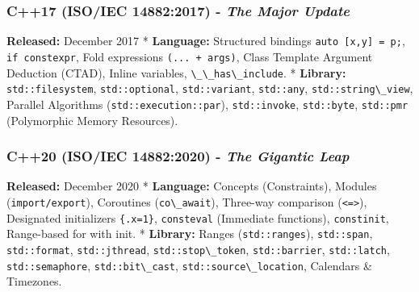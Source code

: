 \hypertarget{c17-isoiec-148822017---the-major-update}{%
\subsubsection{\texorpdfstring{\textbf{C++17 (ISO/IEC 14882:2017)} -
\emph{The Major
Update}}{C++17 (ISO/IEC 14882:2017) - The Major Update}}\label{c17-isoiec-148822017---the-major-update}}

\textbf{Released:} December 2017 * \textbf{Language:} Structured
bindings \passthrough{\lstinline!auto [x,y] = p;!},
\passthrough{\lstinline!if constexpr!}, Fold expressions
\passthrough{\lstinline!(... + args)!}, Class Template Argument
Deduction (CTAD), Inline variables,
\passthrough{\lstinline!\_\_has\_include!}. * \textbf{Library:}
\passthrough{\lstinline!std::filesystem!},
\passthrough{\lstinline!std::optional!},
\passthrough{\lstinline!std::variant!},
\passthrough{\lstinline!std::any!},
\passthrough{\lstinline!std::string\_view!}, Parallel Algorithms
(\passthrough{\lstinline!std::execution::par!}),
\passthrough{\lstinline!std::invoke!},
\passthrough{\lstinline!std::byte!}, \passthrough{\lstinline!std::pmr!}
(Polymorphic Memory Resources).

\hypertarget{c20-isoiec-148822020---the-gigantic-leap}{%
\subsubsection{\texorpdfstring{\textbf{C++20 (ISO/IEC 14882:2020)} -
\emph{The Gigantic
Leap}}{C++20 (ISO/IEC 14882:2020) - The Gigantic Leap}}\label{c20-isoiec-148822020---the-gigantic-leap}}

\textbf{Released:} December 2020 * \textbf{Language:} Concepts
(Constraints), Modules (\passthrough{\lstinline!import/export!}),
Coroutines (\passthrough{\lstinline!co\_await!}), Three-way comparison
(\passthrough{\lstinline!<=>!}), Designated initializers
\passthrough{\lstinline!\{.x=1\}!}, \passthrough{\lstinline!consteval!}
(Immediate functions), \passthrough{\lstinline!constinit!}, Range-based
for with init. * \textbf{Library:} Ranges
(\passthrough{\lstinline!std::ranges!}),
\passthrough{\lstinline!std::span!},
\passthrough{\lstinline!std::format!},
\passthrough{\lstinline!std::jthread!},
\passthrough{\lstinline!std::stop\_token!},
\passthrough{\lstinline!std::barrier!},
\passthrough{\lstinline!std::latch!},
\passthrough{\lstinline!std::semaphore!},
\passthrough{\lstinline!std::bit\_cast!},
\passthrough{\lstinline!std::source\_location!}, Calendars \& Timezones.

